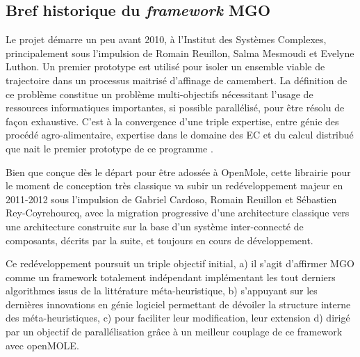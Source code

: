 








\subsection{Bref historique du \textit{framework} MGO}
\label{ssec:historique_mgo}

Le projet démarre un peu avant 2010, à l'Institut des Systèmes Complexes, principalement sous l'impulsion de Romain Reuillon, Salma Mesmoudi et Evelyne Luthon. Un premier prototype est utilisé pour isoler un ensemble viable de trajectoire dans un processus maitrisé d'affinage de camembert. La définition de ce problème constitue un problème multi-objectifs nécessitant l'usage de ressources informatiques importantes, si possible parallélisé, pour être résolu de façon exhaustive. C'est à la convergence d'une triple expertise, entre génie des procédé agro-alimentaire, expertise dans le domaine des EC et du calcul distribué que nait le premier prototype de ce programme \autocite{Mesmoudi2010}.

Bien que conçue dès le départ pour être adossée à OpenMole, cette librairie pour le moment de conception très classique va subir un redéveloppement majeur en 2011-2012 sous l'impulsion de Gabriel Cardoso, Romain Reuillon et Sébastien Rey-Coyrehourcq, avec la migration progressive d'une architecture classique vers une architecture construite sur la base d'un système inter-connecté de composants, décrits par la suite, et toujours en cours de développement.

Ce redéveloppement poursuit un triple objectif initial, a) il s'agit d'affirmer MGO comme un framework totalement indépendant implémentant les tout derniers algorithmes issus de la littérature méta-heuristique, b) s'appuyant sur les dernières innovations en génie logiciel permettant de dévoiler la structure interne des méta-heuristiques, c) pour faciliter leur modification, leur extension d) dirigé par un objectif de parallélisation grâce à un meilleur couplage de ce framework avec openMOLE.

